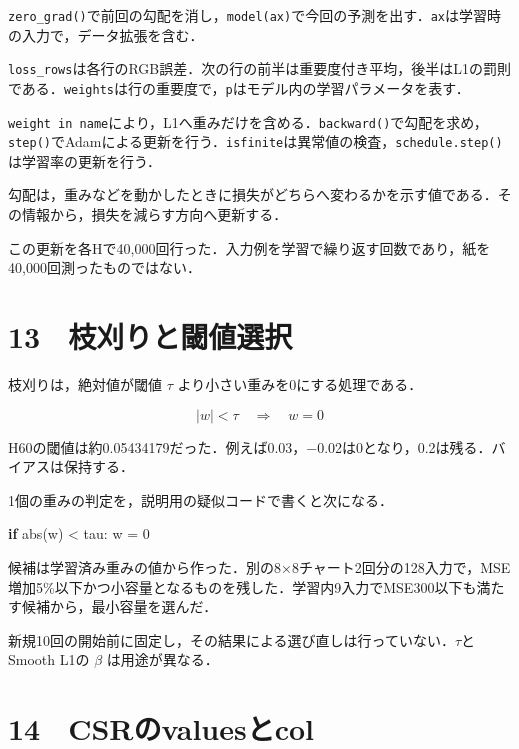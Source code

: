 \documentclass[
  14pt,
  a5paper,
]{extarticle}
\newenvironment{Shaded}{}{}
\newcommand{\BuiltInTok}[1]{\textcolor[rgb]{0.00,0.50,0.00}{#1}}
\newcommand{\ControlFlowTok}[1]{\textcolor[rgb]{0.00,0.44,0.13}{\textbf{#1}}}
\newcommand{\DecValTok}[1]{\textcolor[rgb]{0.25,0.63,0.44}{#1}}
\newcommand{\NormalTok}[1]{#1}
\newcommand{\OperatorTok}[1]{\textcolor[rgb]{0.40,0.40,0.40}{#1}}
\begin{document}
\texttt{zero\_grad()}で前回の勾配を消し，\texttt{model(ax)}で今回の予測を出す．\texttt{ax}は学習時の入力で，データ拡張を含む．

\texttt{loss\_rows}は各行のRGB誤差．次の行の前半は重要度付き平均，後半はL1の罰則である．\texttt{weights}は行の重要度で，\texttt{p}はモデル内の学習パラメータを表す．

\texttt{\textquotesingle{}weight\textquotesingle{}\ in\ name}により，L1へ重みだけを含める．\texttt{backward()}で勾配を求め，\texttt{step()}でAdamによる更新を行う．\texttt{isfinite}は異常値の検査，\texttt{schedule.step()}は学習率の更新を行う．

勾配は，重みなどを動かしたときに損失がどちらへ変わるかを示す値である．その情報から，損失を減らす方向へ更新する．

この更新を各Hで40,000回行った．入力例を学習で繰り返す回数であり，紙を40,000回測ったものではない．

\newpage

\section{13　枝刈りと閾値選択}\label{ux679dux5208ux308aux3068ux95beux5024ux9078ux629e}

枝刈りは，絶対値が閾値 \(\tau\) より小さい重みを0にする処理である．

\[|w|<\tau\quad\Rightarrow\quad w=0\]

H60の閾値は約0.05434179だった．例えば0.03，−0.02は0となり，0.2は残る．バイアスは保持する．

1個の重みの判定を，説明用の疑似コードで書くと次になる．

\begin{Shaded}
\begin{Highlighting}[]
\ControlFlowTok{if} \BuiltInTok{abs}\NormalTok{(w) }\OperatorTok{\textless{}}\NormalTok{ tau:}
\NormalTok{    w }\OperatorTok{=} \DecValTok{0}
\end{Highlighting}
\end{Shaded}

候補は学習済み重みの値から作った．別の8×8チャート2回分の128入力で，MSE増加5\%以下かつ小容量となるものを残した．学習内9入力でMSE300以下も満たす候補から，最小容量を選んだ．

新規10回の開始前に固定し，その結果による選び直しは行っていない．\(\tau\)とSmooth
L1の \(\beta\) は用途が異なる．

\newpage

\section{14　CSRのvaluesとcol}\label{csrux306evaluesux3068col}
\end{document}
